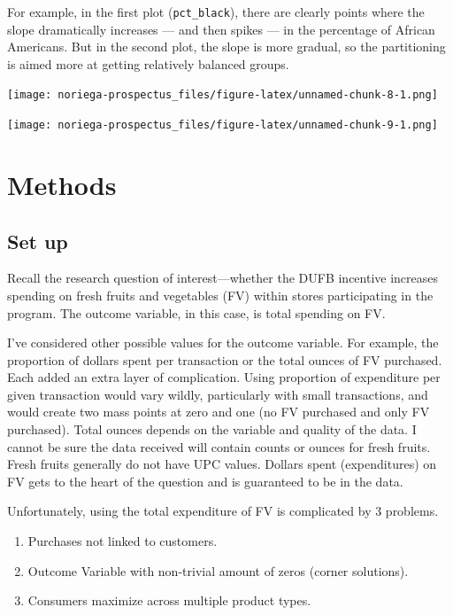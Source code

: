\documentclass[12pt,letterpaperpaper,]{book}
\providecommand{\tightlist}{%
  \setlength{\itemsep}{0pt}\setlength{\parskip}{0pt}}
\begin{document}
For example, in the first plot (\texttt{pct\_black}), there are clearly
points where the slope dramatically increases --- and then spikes --- in
the percentage of African Americans. But in the second plot, the slope
is more gradual, so the partitioning is aimed more at getting relatively
balanced groups.

\texttt{[image: noriega-prospectus\_files/figure-latex/unnamed-chunk-8-1.png]}

\texttt{[image: noriega-prospectus\_files/figure-latex/unnamed-chunk-9-1.png]}

\hypertarget{methods-1}{\section*{Methods}\label{methods-1}}

\subsection*{Set up}\label{set-up}

Recall the research question of interest---whether the DUFB incentive
increases spending on fresh fruits and vegetables (FV) within stores
participating in the program. The outcome variable, in this case, is
total spending on FV.

I've considered other possible values for the outcome variable. For
example, the proportion of dollars spent per transaction or the total
ounces of FV purchased. Each added an extra layer of complication. Using
proportion of expenditure per given transaction would vary wildly,
particularly with small transactions, and would create two mass points
at zero and one (no FV purchased and only FV purchased). Total ounces
depends on the variable and quality of the data. I cannot be sure the
data received will contain counts or ounces for fresh fruits. Fresh
fruits generally do not have UPC values. Dollars spent (expenditures) on
FV gets to the heart of the question and is guaranteed to be in the
data.

Unfortunately, using the total expenditure of FV is complicated by 3
problems.

\begin{enumerate}
\def\labelenumi{\arabic{enumi}.}
\tightlist
\item
  Purchases not linked to customers.
\item
  Outcome Variable with non-trivial amount of zeros (corner solutions).
\item
  Consumers maximize across multiple product types.
\end{enumerate}
\end{document}
